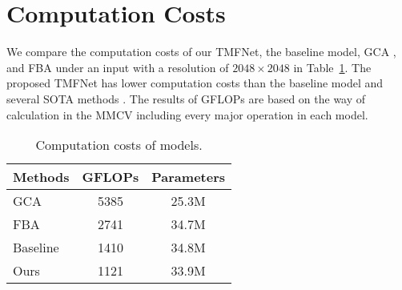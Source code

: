 \documentclass[10pt,twocolumn,letterpaper]{article}
\begin{document}
\section{Computation Costs}
We compare the computation costs of our TMFNet, the baseline model, GCA \cite{gca}, and FBA \cite{fba}  under an input with a resolution of $2048\times 2048$ in Table~\ref{tabsupp:GFLOPs}. The proposed TMFNet  has lower computation costs than the baseline model and several SOTA methods \cite{gca,fba}. The results of GFLOPs are based on the way of calculation in the MMCV  \cite{mmcv} including every major operation in each model.
\begin{table}[h]
    \begin{center}
    \caption{Computation costs of models.}
    \begin{tabular}{l|c|c}
        \hline
        Methods & GFLOPs&Parameters  \\
        \hline
        GCA  \cite{gca} & 5385&25.3M \\
        FBA  \cite{fba} & 2741&34.7M \\
        \hline
        Baseline & 1410&34.8M \\
        Ours & 1121&33.9M\\
        \hline
    \end{tabular}

    \label{tabsupp:GFLOPs}
    \end{center}
\end{table}
\end{document}
